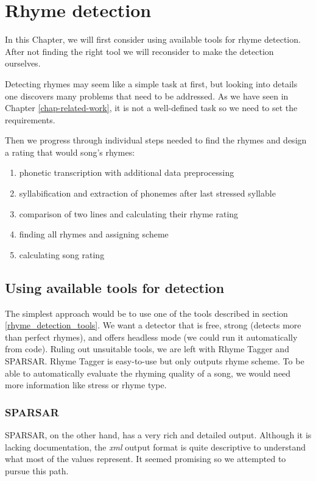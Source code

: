 
\chapter{Rhyme detection}\label{chap-rhyme-analysis}
In this Chapter, we will first consider using available tools for rhyme detection. After not finding the right tool we will reconsider to make the detection ourselves.

Detecting rhymes may seem like a simple task at first, but looking into details one discovers many problems that need to be addressed. As we have seen in Chapter \ref{chap-related-work}, it is not a well-defined task so we need to set the requirements.

Then we progress through individual steps needed to find the rhymes and design a rating that would song's rhymes:


\begin{enumerate}
	\item phonetic transcription with additional data preprocessing	
	\item syllabification and extraction of phonemes after last stressed syllable
	\item comparison of two lines and calculating their rhyme rating  
	\item finding all rhymes and assigning scheme
	\item calculating song rating
\end{enumerate}

\section{Using available tools for detection}
The simplest approach would be to use one of the tools described in section \ref{rhyme_detection_tools}. We want a detector that is free, strong (detects more than perfect rhymes), and offers headless mode (we could run it automatically from code). Ruling out unsuitable tools, we are left with Rhyme Tagger and SPARSAR. Rhyme Tagger is easy-to-use but only outputs rhyme scheme. To be able to automatically evaluate the rhyming quality of a song, we would need more information like stress or rhyme type.

\subsection*{SPARSAR}
SPARSAR, on the other hand, has a very rich and detailed output. Although it is lacking documentation, the \textit{xml} output format is quite descriptive to understand what most of the values represent. It seemed promising so we attempted to pursue this path.

